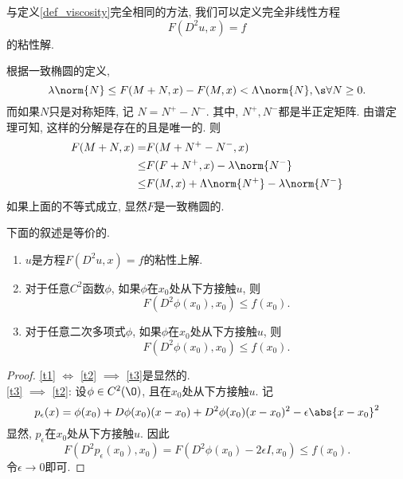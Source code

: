 与定义\eqref{def_viscosity}完全相同的方法, 我们可以定义完全非线性方程 
\begin{equation*}\label{vis_nonlinear_eq}
    F(D^2u, x)=f
\end{equation*}
的粘性解.  
\begin{remark}
    根据一致椭圆的定义, 
    \begin{equation*}
        \lambda \norm{N} \le F(M+N, x) -F(M, x) < \Lambda \norm{N}, \s \forall N \ge 0.  
    \end{equation*}
    而如果$N$只是对称矩阵, 记 $N=N^+-N^-$.  其中, $N^+, N^-$都是半正定矩阵.  由谱定理可知, 这样的分解是存在的且是唯一的.  则
    \begin{equation}
        \begin{split}
            F(M+N, x)= & F(M+N^+-N^-, x)  \\
            \le &F(F+N^+, x)-\lambda \norm{N^-} \\
            \le &F(M, x)+\Lambda \norm{N^+}-\lambda\norm{N^-}
        \end{split}
    \end{equation}
    如果上面的不等式成立, 显然$F$是一致椭圆的.  
\end{remark}
\begin{proposition}
    下面的叙述是等价的.  
    \begin{enumerate}
        \item \label{t1} $u$是方程$F(D^2u, x)=f$的粘性上解.  
        \item \label{t2} 对于任意$C^2$函数$\phi$, 如果$\phi$在$x_0$处从下方接触$u$, 则
        \begin{equation*}
            F(D^2\phi(x_0), x_0)\le f(x_0).  
        \end{equation*}
        \item \label{t3} 对于任意二次多项式$\phi$, 如果$\phi$在$x_0$处从下方接触$u$, 则
        \begin{equation*}
            F(D^2\phi(x_0), x_0)\le f(x_0).  
        \end{equation*}
    \end{enumerate}
\end{proposition}
\begin{proof}
    \eqref{t1} $\iff$ \eqref{t2} $\implies$ \eqref{t3}是显然的.  \\
    \eqref{t3} $\implies$ \eqref{t2}: 设$\phi \in C^2(\O)$, 且在$x_0$处从下方接触$u$.  记
    \begin{equation}
        p_\epsilon(x)=\phi(x_0)+D\phi(x_0)(x-x_0)+D^2\phi(x_0)(x-x_0)^2 -\epsilon\abs{x-x_0}^2
    \end{equation}
    显然, $p_\epsilon$在$x_0$处从下方接触$u$.  因此 
    \begin{equation}
        F(D^2p_\epsilon(x_0), x_0)=F(D^2\phi(x_0)-2\epsilon I, x_0) \le f(x_0).  
    \end{equation}
    令$\epsilon \to 0$即可.  
\end{proof}
